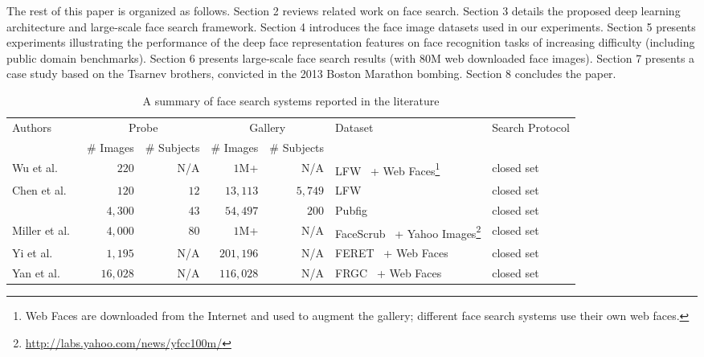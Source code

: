 \documentclass[10pt,journal,compsoc]{IEEEtran}
\begin{document}
The rest of this paper is organized as follows. Section 2 reviews related work on face search. Section 3 details the proposed deep learning architecture and large-scale face search framework. Section 4 introduces the face image datasets used in our experiments. Section 5 presents experiments illustrating the performance of the deep face representation features on face recognition tasks of increasing difficulty (including public domain benchmarks). Section 6 presents large-scale face search results (with $80$M web downloaded face images). Section 7 presents a case study based on the Tsarnev brothers, convicted in the 2013 Boston Marathon bombing. Section 8 concludes the paper.

\begin{table*}[htbp]
\begin{minipage}{\textwidth}
\centering
\caption{A summary of face search systems reported in the literature}\label{tab:fr}
\begin{tabular}{lrrrrll}
\toprule
\multirow{2}{*}{Authors} & \multicolumn{2}{c}{Probe} & \multicolumn{2}{c}{Gallery} & \multirow{2}{*}{Dataset} & \multirow{2}{*}{Search Protocol} \\ \cmidrule(lr){2-3} \cmidrule(lr){4-5}
            & \# Images  & \# Subjects & \# Images & \# Subjects &              &                    \\ \midrule
Wu et al.~\cite{faceretrieval:wu2010}     & $220$    & N/A    & $1$M+ & N/A   & LFW~\cite{DB:LFWTech} + Web Faces\footnote{Web Faces are downloaded from the Internet and used to augment the gallery; different face search systems use their own web faces.} & closed set\\
Chen et al.~\cite{faceretrieval:chen2012} & $120$    & $12$ & $13,113$    & $5,749$ & LFW~\cite{DB:LFWTech} & closed set\\
                                          & $4,300$  & $43$ & $54,497$    & $200$   & Pubfig~\cite{CAVE_0296} & closed set\\
Miller et al.~\cite{miller2015megaface}   & $4,000$  & $80$ & $1$M+ & N/A       & FaceScrub~\cite{db:facecrab} + Yahoo Images\footnote{\url{http://labs.yahoo.com/news/yfcc100m/}} & closed set\\
Yi et al.~\cite{fr:fastmatching}          & $1,195$  & N/A    & $201,196$   & N/A       & FERET~\cite{db:FERET} + Web Faces & closed set \\
Yan et al.~\cite{fr:sh}                   & $16,028$ &  N/A   & $116,028$   & N/A       & FRGC~\cite{db:frgc} + Web Faces & closed set \\

\end{tabular}
\end{minipage}
\end{table*}
\end{document}
